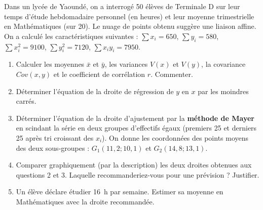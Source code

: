 \documentclass[11pt]{article}
\begin{document}
\begin{exercice}
Dans un lycée de Yaoundé, on a interrogé 50 élèves de Terminale D sur leur temps d'étude hebdomadaire personnel (en heures) et leur moyenne trimestrielle en Mathématiques (sur 20). Le nuage de points obtenu suggère une liaison affine. On a calculé les caractéristiques suivantes :
$\sum x_i = 650$, $\sum y_i = 580$, $\sum x_i^2 = 9100$, $\sum y_i^2 = 7120$, $\sum x_i y_i = 7950$.

\begin{enumerate}
    \item Calculer les moyennes $\bar{x}$ et $\bar{y}$, les variances $V(x)$ et $V(y)$, la covariance $Cov(x,y)$ et le coefficient de corrélation $r$. Commenter.
    \item Déterminer l'équation de la droite de régression de $y$ en $x$ par les moindres carrés.
    \item Déterminer l'équation de la droite d'ajustement par la \textbf{méthode de Mayer} en scindant la série en deux groupes d'effectifs égaux (premiers 25 et derniers 25 après tri croissant des $x_i$). On donne les coordonnées des points moyens des deux sous-groupes : $G_1(11,2 ; 10,1)$ et $G_2(14,8 ; 13,1)$.
    \item Comparer graphiquement (par la description) les deux droites obtenues aux questions 2 et 3. Laquelle recommanderiez-vous pour une prévision ? Justifier.
    \item Un élève déclare étudier \SI{16}{\hour} par semaine. Estimer sa moyenne en Mathématiques avec la droite recommandée.
\end{enumerate}
\end{exercice}
\end{document}
